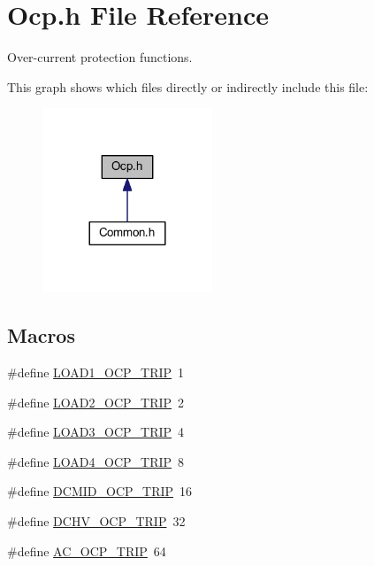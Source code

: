 \hypertarget{a00030}{\section{Ocp.\-h File Reference}
\label{a00030}
}


Over-\/current protection functions.  


This graph shows which files directly or indirectly include this file\-:\nopagebreak
\begin{figure}[H]
\begin{center}
\leavevmode
\includegraphics[width=144pt]{a00067}
\end{center}
\end{figure}
\subsection*{Macros}
\begin{DoxyCompactItemize}
\item 
\#define \hyperlink{a00030_a4ec4aa0e60bea1a3e34167b2571a65de}{L\-O\-A\-D1\-\_\-\-O\-C\-P\-\_\-\-T\-R\-I\-P}~1
\item 
\#define \hyperlink{a00030_af45ed9a707fb208c436f4f9cfd0adfec}{L\-O\-A\-D2\-\_\-\-O\-C\-P\-\_\-\-T\-R\-I\-P}~2
\item 
\#define \hyperlink{a00030_a94b1ce836bab1ddbaf5a153cf84f42b7}{L\-O\-A\-D3\-\_\-\-O\-C\-P\-\_\-\-T\-R\-I\-P}~4
\item 
\#define \hyperlink{a00030_a271333484c12cc2d424b2870bbd2ea77}{L\-O\-A\-D4\-\_\-\-O\-C\-P\-\_\-\-T\-R\-I\-P}~8
\item 
\#define \hyperlink{a00030_ad4ef44d1890a81d34d453203c204384a}{D\-C\-M\-I\-D\-\_\-\-O\-C\-P\-\_\-\-T\-R\-I\-P}~16
\item 
\#define \hyperlink{a00030_a79277b6c4861afbef292e26f4360b224}{D\-C\-H\-V\-\_\-\-O\-C\-P\-\_\-\-T\-R\-I\-P}~32
\item 
\#define \hyperlink{a00030_a53e3b040fd854d92e865a4e59f1630a2}{A\-C\-\_\-\-O\-C\-P\-\_\-\-T\-R\-I\-P}~64
\end{DoxyCompactItemize}
